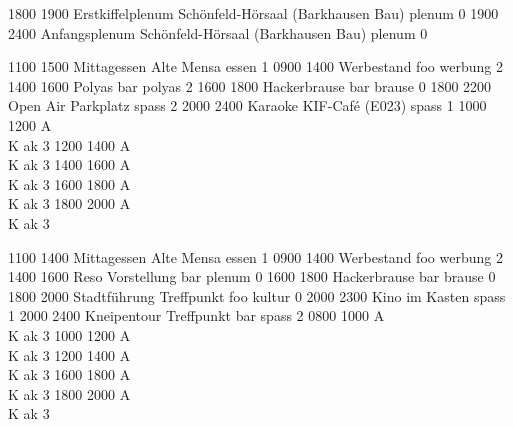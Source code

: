 \documentclass[a5paper,9pt]{scrreprt}
\begin{document}
\begin{timetable}
   {1800} {1900} {Erstkiffelplenum} {Schönfeld-Hörsaal (Barkhausen Bau)} {} {plenum}  {0}
   {1900} {2400} {Anfangsplenum}    {Schönfeld-Hörsaal (Barkhausen Bau)} {} {plenum}  {0}

   {1100} {1500} {Mittagessen}      {Alte Mensa}       {} {essen}   {1}
   {0900} {1400} {Werbestand}       {foo}              {} {werbung} {2}
   {1400} {1600} {Polyas}           {bar}              {} {polyas}  {2}
   {1600} {1800} {Hackerbrause}     {bar}              {} {brause}  {0}
   {1800} {2200} {Open Air}         {Parkplatz}        {} {spass}   {2}
   {2000} {2400} {Karaoke}          {KIF-Café (E023)}  {} {spass}   {1}
   {1000} {1200} {\hfill A\\ \hfill K} {}              {} {ak}      {3}
   {1200} {1400} {\hfill A\\ \hfill K} {}              {} {ak}      {3}
   {1400} {1600} {\hfill A\\ \hfill K} {}              {} {ak}      {3}
   {1600} {1800} {\hfill A\\ \hfill K} {}              {} {ak}      {3}
   {1800} {2000} {\hfill A\\ \hfill K} {}              {} {ak}      {3}
  
   {1100} {1400} {Mittagessen}      {Alte Mensa}       {} {essen}   {1}
   {0900} {1400} {Werbestand}       {foo}              {} {werbung} {2}
   {1400} {1600} {Reso Vorstellung} {bar}              {} {plenum}  {0}
   {1600} {1800} {Hackerbrause}     {bar}              {} {brause}  {0}
   {1800} {2000} {Stadtführung}     {Treffpunkt foo}   {} {kultur}  {0}
   {2000} {2300} {Kino}             {im Kasten}        {} {spass}   {1}
   {2000} {2400} {Kneipentour}      {Treffpunkt bar}   {} {spass}   {2}
   {0800} {1000} {\hfill A\\ \hfill K} {}              {} {ak}      {3}
   {1000} {1200} {\hfill A\\ \hfill K} {}              {} {ak}      {3}
   {1200} {1400} {\hfill A\\ \hfill K} {}              {} {ak}      {3}
   {1600} {1800} {\hfill A\\ \hfill K} {}              {} {ak}      {3}
   {1800} {2000} {\hfill A\\ \hfill K} {}              {} {ak}      {3}


\end{timetable}
\end{document}
